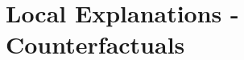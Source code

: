 \documentclass[11pt,compress,t,notes=noshow, aspectratio=169, xcolor=table]{beamer}
\begin{document}
\section{Local Explanations - Counterfactuals}




% 
\end{document}
